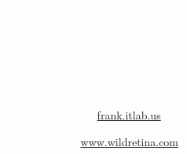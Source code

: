 \documentclass[t]{beamer}
\begin{document}
{
\begin{frame}[b,plain]
\hfill\textcolor{white}{\tiny \textcopyright Entomart, Wikimedia}
\end{frame}
}
{
\begin{frame}[b]
\tiny\textcolor{white}{Silke Baron, Wikimedia }
\end{frame}
}
%
{
\begin{frame}[b]
\hfill\textcolor{white}{\tiny Pierre Dalous, Wikimedia, \ccbysa{}}
\end{frame}
}
%
{
\begin{frame}[b]
\hfill\textcolor{white}{\tiny \textcopyright Dustin Siegel, with permission.}
\end{frame}
}
%
{
\begin{frame}[b]
\hfill\textcolor{white}{\tiny C. Frank Starmer, \href{http://frank.itlab.us}{frank.itlab.us},\ccbyncsa{}}
\end{frame}
}
%
{
\begin{frame}[b]
\hfill\textcolor{white}{\tiny David Carillet, \href{http://www.wildretina.com}{www.wildretina.com}, }
\end{frame}
}
\end{document}
